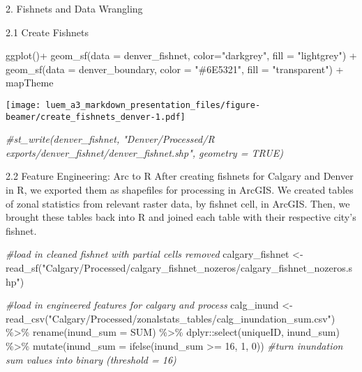 \documentclass[
  ignorenonframetext,
]{beamer}
\newenvironment{Shaded}{\begin{snugshade}}{\end{snugshade}}
\newcommand{\AttributeTok}[1]{\textcolor[rgb]{0.77,0.63,0.00}{#1}}
\newcommand{\CommentTok}[1]{\textcolor[rgb]{0.56,0.35,0.01}{\textit{#1}}}
\newcommand{\DecValTok}[1]{\textcolor[rgb]{0.00,0.00,0.81}{#1}}
\newcommand{\FunctionTok}[1]{\textcolor[rgb]{0.00,0.00,0.00}{#1}}
\newcommand{\NormalTok}[1]{#1}
\newcommand{\OtherTok}[1]{\textcolor[rgb]{0.56,0.35,0.01}{#1}}
\newcommand{\SpecialCharTok}[1]{\textcolor[rgb]{0.00,0.00,0.00}{#1}}
\newcommand{\StringTok}[1]{\textcolor[rgb]{0.31,0.60,0.02}{#1}}
\begin{document}
\begin{frame}[fragile]{2. Fishnets and Data Wrangling}
\begin{block}{2.1 Create Fishnets}
\begin{Shaded}
\begin{Highlighting}[]
\FunctionTok{ggplot}\NormalTok{()}\SpecialCharTok{+}
  \FunctionTok{geom\_sf}\NormalTok{(}\AttributeTok{data =}\NormalTok{ denver\_fishnet,}
          \AttributeTok{color=}\StringTok{"darkgrey"}\NormalTok{, }\AttributeTok{fill =} \StringTok{"lightgrey"}\NormalTok{) }\SpecialCharTok{+}
  \FunctionTok{geom\_sf}\NormalTok{(}\AttributeTok{data =}\NormalTok{ denver\_boundary, }
          \AttributeTok{color =} \StringTok{"\#6E5321"}\NormalTok{, }\AttributeTok{fill =} \StringTok{"transparent"}\NormalTok{) }\SpecialCharTok{+}
\NormalTok{  mapTheme}
\end{Highlighting}
\end{Shaded}

\texttt{[image: luem\_a3\_markdown\_presentation\_files/figure-beamer/create\_fishnets\_denver-1.pdf]}

\begin{Shaded}
\begin{Highlighting}[]
\CommentTok{\#st\_write(denver\_fishnet, "Denver/Processed/R exports/denver\_fishnet/denver\_fishnet.shp", geometry = TRUE)}
\end{Highlighting}
\end{Shaded}
\end{block}

\begin{block}{2.2 Feature Engineering: Arc to R}
\protect\hypertarget{feature-engineering-arc-to-r}{}
After creating fishnets for Calgary and Denver in R, we exported them as
shapefiles for processing in ArcGIS. We created tables of zonal
statistics from relevant raster data, by fishnet cell, in ArcGIS. Then,
we brought these tables back into R and joined each table with their
respective city's fishnet.

\begin{Shaded}
\begin{Highlighting}[]
\CommentTok{\#load in cleaned fishnet with partial cells removed}
\NormalTok{calgary\_fishnet }\OtherTok{\textless{}{-}}  \FunctionTok{read\_sf}\NormalTok{(}\StringTok{"Calgary/Processed/calgary\_fishnet\_nozeros/calgary\_fishnet\_nozeros.shp"}\NormalTok{)}

\CommentTok{\#load in engineered features for calgary and process}
\NormalTok{calg\_inund }\OtherTok{\textless{}{-}} \FunctionTok{read\_csv}\NormalTok{(}\StringTok{"Calgary/Processed/zonalstats\_tables/calg\_inundation\_sum.csv"}\NormalTok{) }\SpecialCharTok{\%\textgreater{}\%}
  \FunctionTok{rename}\NormalTok{(}\AttributeTok{inund\_sum =}\NormalTok{ SUM) }\SpecialCharTok{\%\textgreater{}\%} 
\NormalTok{  dplyr}\SpecialCharTok{::}\FunctionTok{select}\NormalTok{(uniqueID, inund\_sum) }\SpecialCharTok{\%\textgreater{}\%} 
  \FunctionTok{mutate}\NormalTok{(}\AttributeTok{inund\_sum =} \FunctionTok{ifelse}\NormalTok{(inund\_sum }\SpecialCharTok{\textgreater{}=} \DecValTok{16}\NormalTok{, }\DecValTok{1}\NormalTok{, }\DecValTok{0}\NormalTok{)) }\CommentTok{\#turn inundation sum values into binary (threshold = 16)}


\end{Highlighting}
\end{Shaded}
\end{block}
\end{frame}
\end{document}
